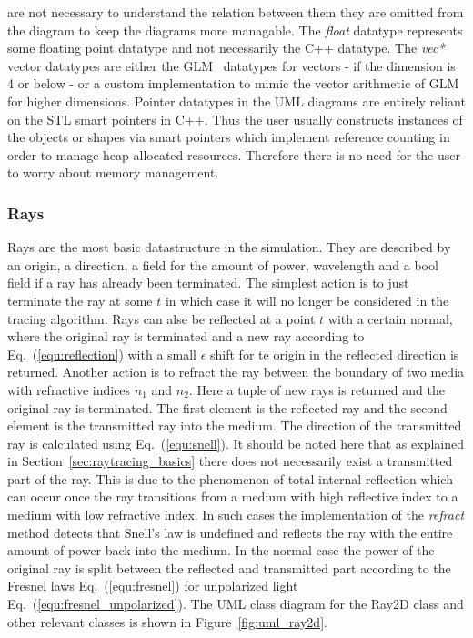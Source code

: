 \documentclass[a4paper,10pt]{article}
\newcommand{\equref}[1]{Eq.~(\ref{#1})}
\newcommand{\secref}[1]{Section~\ref{#1}}
\newcommand{\figref}[1]{Figure~\ref{#1}}
\begin{document}
    are not necessary to understand the relation between them
    they are omitted from the diagram to keep the diagrams more
    managable.
    The \emph{float} datatype represents some floating point datatype
    and not necessarily the C++ datatype.
    The \emph{vec*} vector datatypes are either the GLM~\cite{glm} datatypes
    for vectors - if the dimension is 4 or below - or a custom implementation
    to mimic the vector arithmetic of GLM for higher dimensions.
    Pointer datatypes in the UML diagrams are entirely reliant on
    the STL smart pointers in C++.
    Thus the user usually constructs instances of the objects or shapes
    via smart pointers which implement reference counting
    in order to manage heap allocated resources.
    Therefore there is no need for the user to worry about 
    memory management. 

    \subsubsection{Rays}

    Rays are the most basic datastructure in the simulation.
    They are described by an origin, a direction, a field for the
    amount of power, wavelength and a bool field if a ray has
    already been terminated.
    The simplest action is to just terminate the ray at some $t$
    in which case it will no longer be considered in the tracing
    algorithm.
    Rays can alse be reflected at a point $t$ with a certain normal, 
    where the original ray is terminated and a new ray according to \equref{equ:reflection} with a small
    $\epsilon$ shift for te origin in the reflected direction is returned.
    Another action is to refract the ray between the boundary
    of two media with refractive indices $n_1$ and $n_2$.
    Here a tuple of new rays is returned and the original ray
    is terminated.
    The first element is the reflected ray and the second
    element is the transmitted ray into the medium.
    The direction of the transmitted ray is calculated using
    \equref{equ:snell}.
    It should be noted here that as explained in
    \secref{sec:raytracing_basics}
    there does not necessarily exist a transmitted part of the ray.
    This is due to the phenomenon of total internal reflection
    which can occur once the ray transitions from a medium with high
    reflective index to a medium with low refractive index.
    In such cases the implementation of the \emph{refract} method
    detects that Snell's law is undefined and reflects the ray
    with the entire amount of power back into the medium.
    In the normal case the power of the original ray
    is split between the reflected and transmitted part according
    to the Fresnel laws \equref{equ:fresnel} for unpolarized
    light \equref{equ:fresnel_unpolarized}. 
    The UML class diagram for the Ray2D class and other relevant
    classes is shown in \figref{fig:uml_ray2d}.
\end{document}
